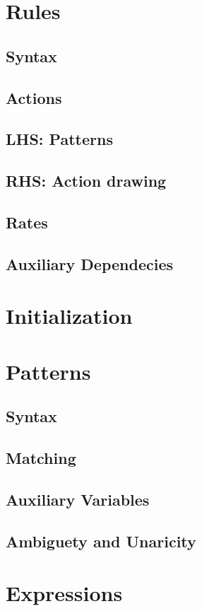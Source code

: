 \documentclass{article}
\begin{document}
\section{Rules}
\subsection{Syntax}
\subsection{Actions}
\subsection{LHS: Patterns}
\subsection{RHS: Action drawing}
\subsection{Rates}
\subsection{Auxiliary Dependecies}

\section{Initialization}

\section{Patterns}
\subsection{Syntax}
\subsection{Matching}
\subsection{Auxiliary Variables}
\subsection{Ambiguety and Unaricity}

\section{Expressions}
\end{document}

